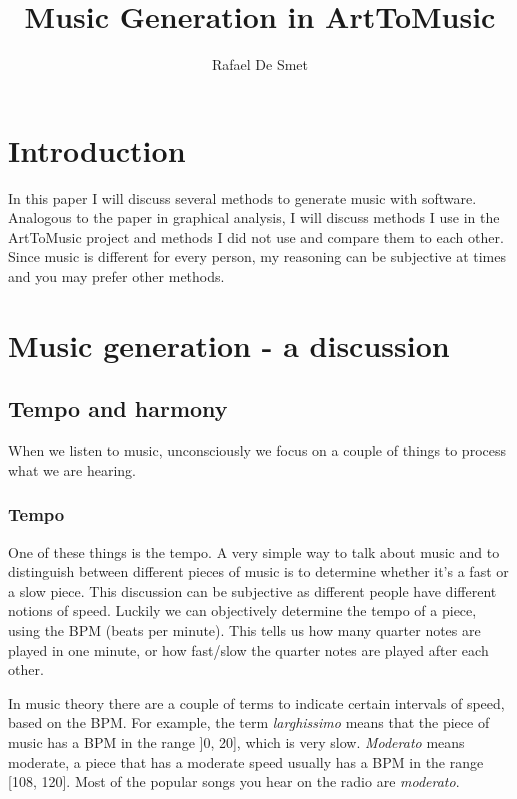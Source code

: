 \documentclass[12pt]{article}
\begin{document}
\title{Music Generation in ArtToMusic}
\author{Rafael De Smet}

\maketitle
\tableofcontents

\section{Introduction}

In this paper I will discuss several methods to generate music with software. Analogous to the paper in graphical analysis, I will discuss methods I use in the ArtToMusic project and methods I did not use and compare them to each other. Since music is different for every person, my reasoning can be subjective at times and you may prefer other methods. 

\section{Music generation - a discussion}

\subsection{Tempo and harmony}

When we listen to music, unconsciously we focus on a couple of things to process what we are hearing.

\subsubsection{Tempo}

One of these things is the tempo. A very simple way to talk about music and to distinguish between different pieces of music is to determine whether it's a fast or a slow piece. This discussion can be subjective as different people have different notions of speed. Luckily we can objectively determine the tempo of a piece, using the BPM (beats per minute).
This tells us how many quarter notes are played in one minute, or how fast/slow the quarter notes are played after each other.
\newline

In music theory there are a couple of terms to indicate certain intervals of speed, based on the BPM. For example, the term \textit{larghissimo} means that the piece of music has a BPM in the range ]0, 20], which is very slow. \textit{Moderato} means moderate, a piece that has a moderate speed usually has a BPM in the range [108, 120]. Most of the popular songs you hear on the radio are \textit{moderato}.
\end{document}
